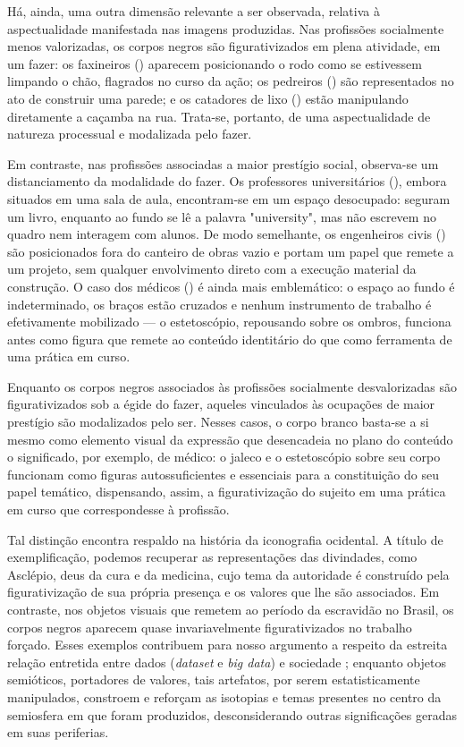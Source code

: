 \documentclass[portuguese]{textolivre}
\begin{document}
Há, ainda, uma outra dimensão relevante a ser observada, relativa à aspectualidade manifestada nas imagens produzidas. Nas profissões socialmente menos valorizadas, os corpos negros são figurativizados em plena atividade, em um fazer: os faxineiros () aparecem posicionando o rodo como se estivessem limpando o chão, flagrados no curso da ação; os pedreiros () são representados no ato de construir uma parede; e os catadores de lixo () estão manipulando diretamente a caçamba na rua. Trata-se, portanto, de uma aspectualidade de natureza processual e modalizada pelo fazer.

Em contraste, nas profissões associadas a maior prestígio social, observa-se um distanciamento da modalidade do fazer. Os professores universitários (), embora situados em uma sala de aula, encontram-se em um espaço desocupado: seguram um livro, enquanto ao fundo se lê a palavra "university", mas não escrevem no quadro nem interagem com alunos. De modo semelhante, os engenheiros civis () são posicionados fora do canteiro de obras vazio e portam um papel que remete a um projeto, sem qualquer envolvimento direto com a execução material da construção. O caso dos médicos () é ainda mais emblemático: o espaço ao fundo é indeterminado, os braços estão cruzados e nenhum instrumento de trabalho é efetivamente mobilizado — o estetoscópio, repousando sobre os ombros, funciona antes como figura que remete ao conteúdo identitário do que como ferramenta de uma prática em curso.

Enquanto os corpos negros associados às profissões socialmente desvalorizadas são figurativizados sob a égide do fazer, aqueles vinculados às ocupações de maior prestígio são modalizados pelo ser. Nesses casos, o corpo branco basta-se a si mesmo como elemento visual da expressão que desencadeia no plano do conteúdo o significado, por exemplo, de médico: o jaleco e o estetoscópio sobre seu corpo funcionam como figuras autossuficientes e essenciais para a constituição do seu papel temático, dispensando, assim, a figurativização do sujeito em uma prática em curso que correspondesse à profissão.

Tal distinção encontra respaldo na história da iconografia ocidental. A título de exemplificação, podemos recuperar as representações das divindades, como Asclépio, deus da cura e da medicina, cujo tema da autoridade é construído pela figurativização de sua própria presença e os valores que lhe são associados. Em contraste, nos objetos visuais que remetem ao período da escravidão no Brasil, os corpos negros aparecem quase invariavelmente figurativizados no trabalho forçado. Esses exemplos contribuem para nosso argumento a respeito da estreita relação entretida entre dados (\textit{dataset} e \textit{big data}) e sociedade \cite{moraes2021nocao,moraes2024semiotica}; enquanto objetos semióticos, portadores de valores, tais artefatos, por serem estatisticamente manipulados, constroem e reforçam as isotopias e temas presentes no centro da semiosfera em que foram produzidos, desconsiderando outras significações geradas em suas periferias.
\end{document}
